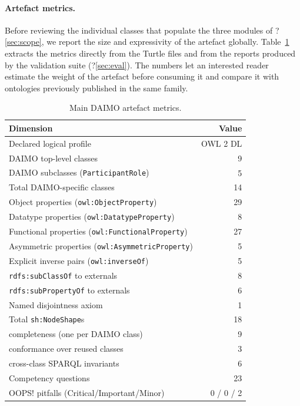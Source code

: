 \documentclass[Afour,sagev,times]{sagej}
\newcommand{\code}[1]{\texttt{#1}}
\begin{document}
\paragraph{Artefact metrics.}\label{sec:metrics}

Before reviewing the individual classes that populate the three modules of ?\ref{sec:scope}, we report the size and expressivity of the artefact globally. Table~\ref{tab:metrics} extracts the metrics directly from the Turtle files and from the reports produced by the validation suite (?\ref{sec:eval}). The numbers let an interested reader estimate the weight of the artefact before consuming it and compare it with ontologies previously published in the same family.

\begin{table}[tb]
\small\sf\centering
\caption{Main DAIMO artefact metrics.\label{tab:metrics}}
\begin{tabular}{@{}p{4.6cm}r@{}}
\toprule
\textbf{Dimension} & \textbf{Value} \\
\midrule
Declared logical profile & OWL 2 DL \\
DAIMO top-level classes & 9 \\
DAIMO subclasses (\code{ParticipantRole}) & 5 \\
Total DAIMO-specific classes & 14 \\
Object properties (\code{owl:ObjectProperty}) & 29 \\
Datatype properties (\code{owl:DatatypeProperty}) & 8 \\
Functional properties (\code{owl:FunctionalProperty}) & 27 \\
Asymmetric properties (\code{owl:AsymmetricProperty}) & 5 \\
Explicit inverse pairs (\code{owl:inverseOf}) & 5 \\
\code{rdfs:subClassOf} to externals & 8 \\
\code{rdfs:subPropertyOf} to externals & 6 \\
Named disjointness axiom & 1 \\
Total \code{sh:NodeShape}s & 18 \\
\quad completeness (one per DAIMO class) & 9 \\
\quad conformance over reused classes & 3 \\
\quad cross-class SPARQL invariants & 6 \\
Competency questions & 23 \\
OOPS! pitfalls (Critical/Important/Minor) & 0 / 0 / 2 \\
\bottomrule
\end{tabular}
\end{table}
\end{document}
